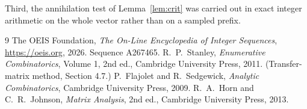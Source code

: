 \documentclass[11pt,a4paper]{article}
\theoremstyle{plain}
\theoremstyle{definition}
\begin{document}
Third, the annihilation test of Lemma~\ref{lem:crit} was carried out in exact integer
arithmetic on the whole vector rather than on a sampled prefix.

\begin{thebibliography}{9}
 The OEIS Foundation, \emph{The On-Line Encyclopedia of Integer
Sequences}, \url{https://oeis.org}, 2026. Sequence A267465.
 R.~P.~Stanley, \emph{Enumerative Combinatorics}, Volume 1, 2nd ed.,
Cambridge University Press, 2011. (Transfer-matrix method, Section 4.7.)
 P.~Flajolet and R.~Sedgewick, \emph{Analytic Combinatorics}, Cambridge
University Press, 2009.
 R.~A.~Horn and C.~R.~Johnson, \emph{Matrix Analysis}, 2nd ed., Cambridge
University Press, 2013.
\end{thebibliography}
\end{document}
